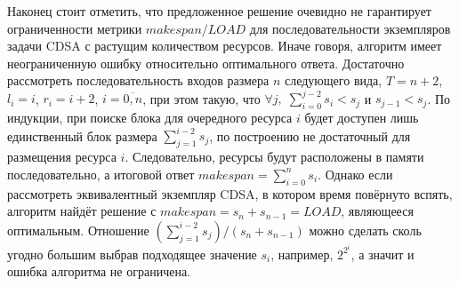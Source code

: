 Наконец стоит отметить, что предложенное решение очевидно не гарантирует ограниченности метрики $makespan/LOAD$ для последовательности экземпляров задачи CDSA с растущим количеством ресурсов.
Иначе говоря, алгоритм имеет неограниченную ошибку относительно оптимального ответа.
Достаточно рассмотреть последовательность входов размера $n$ следующего вида, $T = n + 2$, $l_i = i$, $r_i = i + 2$, $i = \overline{0,n}$, при этом такую, что $\forall j,\;\sum_{i=0}^{j-2} s_i < s_j$ и $s_{j-1} < s_j$.
По индукции, при поиске блока для очередного ресурса $i$ будет доступен лишь единственный блок размера $\sum_{j=1}^{i-2} s_j$, по построению не достаточный для размещения ресурса $i$.
Следовательно, ресурсы будут расположены в памяти последовательно, а итоговой ответ $makespan = \sum_{i=0}^n s_i$.
Однако если рассмотреть эквивалентный экземпляр CDSA, в котором время повёрнуто вспять, алгоритм найдёт решение с $makespan = s_n + s_{n-1} = LOAD$, являющееся оптимальным.
Отношение $\left(\sum_{j=1}^{i-2} s_j\right)/\left(s_n + s_{n-1}\right)$ можно сделать сколь угодно большим выбрав подходящее значение $s_i$, например, $2^{2^i}$, а значит и ошибка алгоритма не ограничена.
